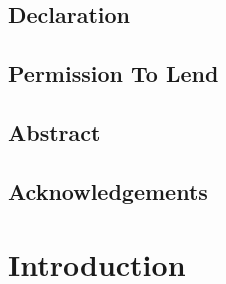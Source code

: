 \documentclass{report}
\begin{document}
	


	\section*{Declaration}
	
	\pagebreak

	\section*{Permission To Lend}
	
	\pagebreak

	\section*{Abstract}
	
	\pagebreak

	\section*{Acknowledgements}
	
	\pagebreak

	\tableofcontents
	\cleardoublepage

	\chapter{Introduction}
	
	
	\printbibliography
\end{document}

